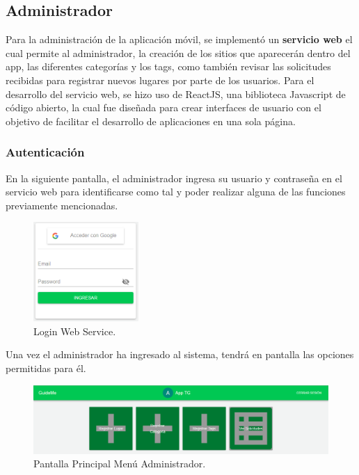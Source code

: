 \documentclass[12pt,letterpaper,openany]{book}
\begin{document}
\subsection{Administrador}
Para la administración de la aplicación móvil, se implementó un \textbf{servicio web} el cual permite al administrador, la creación de los sitios que aparecerán dentro del app, las diferentes categorías y los tags, como también revisar las solicitudes recibidas para registrar nuevos lugares por parte de los usuarios.
\vspace{5mm}\newline
Para el desarrollo del servicio web, se hizo uso de ReactJS, una biblioteca Javascript de código abierto, la cual fue diseñada para crear interfaces de usuario con el objetivo de facilitar el desarrollo de aplicaciones en una sola página.

\subsubsection{Autenticación}
En la siguiente pantalla, el administrador ingresa su usuario y contraseña en el servicio web para identificarse como tal y poder realizar alguna de las funciones previamente mencionadas.

\begin{figure}[H]
\begin{center}
\includegraphics[width=4cm]{./imagenes/admin/login}
\caption{Login Web Service.}
\end{center}
\end{figure}

Una vez el administrador ha ingresado al sistema, tendrá en pantalla las opciones permitidas para él.

\begin{figure}[H]
\begin{center}
\includegraphics[width=13cm]{./imagenes/admin/p_principal}
\caption{Pantalla Principal Menú Administrador.}
\end{center}
\end{figure}
\end{document}

